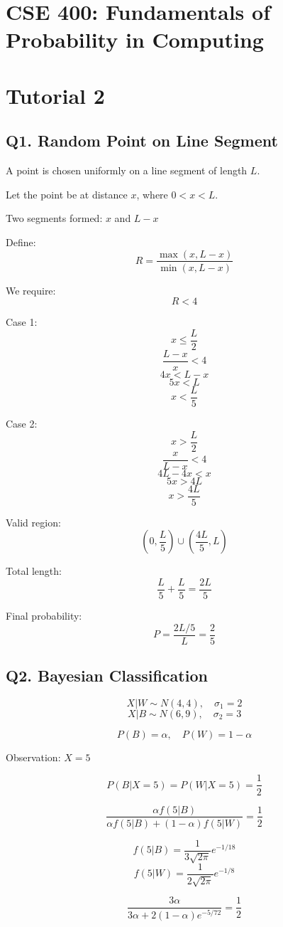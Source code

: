 \documentclass{article}
\begin{document}
\section*{CSE 400: Fundamentals of Probability in Computing}
\section*{Tutorial 2}

\subsection*{Q1. Random Point on Line Segment}

A point is chosen uniformly on a line segment of length $L$.

Let the point be at distance $x$, where $0 < x < L$.

Two segments formed: $x$ and $L-x$

Define:
\[
R = \frac{\max(x, L-x)}{\min(x, L-x)}
\]

We require:
\[
R < 4
\]

Case 1:
\[
x \le \frac{L}{2}
\]
\[
\frac{L-x}{x} < 4
\]
\[
4x < L - x
\]
\[
5x < L
\]
\[
x < \frac{L}{5}
\]

Case 2:
\[
x > \frac{L}{2}
\]
\[
\frac{x}{L-x} < 4
\]
\[
4L - 4x < x
\]
\[
5x > 4L
\]
\[
x > \frac{4L}{5}
\]

Valid region:
\[
(0, \frac{L}{5}) \cup (\frac{4L}{5}, L)
\]

Total length:
\[
\frac{L}{5} + \frac{L}{5} = \frac{2L}{5}
\]

Final probability:
\[
P = \frac{2L/5}{L} = \frac{2}{5}
\]

\subsection*{Q2. Bayesian Classification}

\[
X|W \sim N(4,4), \quad \sigma_1 = 2
\]
\[
X|B \sim N(6,9), \quad \sigma_2 = 3
\]

\[
P(B) = \alpha, \quad P(W) = 1-\alpha
\]

Observation: $X = 5$

\[
P(B|X=5) = P(W|X=5) = \frac{1}{2}
\]

\[
\frac{\alpha f(5|B)}{\alpha f(5|B) + (1-\alpha) f(5|W)} = \frac{1}{2}
\]

\[
f(5|B) = \frac{1}{3\sqrt{2\pi}} e^{-1/18}
\]
\[
f(5|W) = \frac{1}{2\sqrt{2\pi}} e^{-1/8}
\]

\[
\frac{3\alpha}{3\alpha + 2(1-\alpha)e^{-5/72}} = \frac{1}{2}
\]
\end{document}

